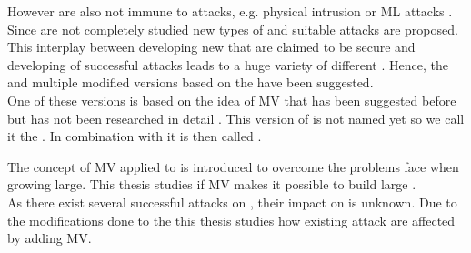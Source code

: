
However \pufs are also not immune to attacks, e.g. physical intrusion or \acl{ML} attacks \cite{Tajik2014PhysicalPUFs,Ruhrmair2010ModelingFunctions,Becker2015ThePUFs,Helfmeier2014PhysicalFunctions}.
Since \pufs are not completely studied new types of \pufs and suitable attacks are proposed.\\
This interplay between developing new \pufs that are claimed to be secure and developing of successful attacks leads to a huge variety of different \pufs \cite{Ruhrmair2014PUFOverview}.
Hence, the \apuf and multiple modified versions based on the \apuf have been suggested.\\
One of these versions is based on the idea of \ac{MV} that has been suggested before but has not been researched in detail \cite{Ruhrmair2013PUFData}.
This version of \apufs is not named yet so we call it the \mpuf.
In combination with \xpufs it is then called \mxpufs.

The concept of \ac{MV} applied to \apufs is introduced to overcome the problems \xpufs face when growing large.
This thesis studies if \ac{MV} makes it possible to build large \xpufs.\\
As there exist several successful attacks on \apufs, their impact on \mpuf is unknown.
Due to the modifications done to the \apuf this thesis studies how existing attack are affected by adding \ac{MV}.

